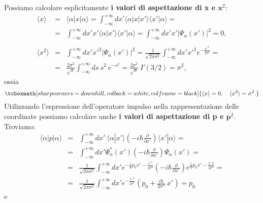 \documentclass[a4paper,12pt,oneside]{book}
\begin{document}
Possiamo calcolare esplicitamente \textbf{i valori di aspettazione di x e $\mathbf x^2$}:
	\begin{eqnarray}
		\langle x \rangle &=& \langle \alpha | x | \alpha \rangle = \int_{-\infty}^{+\infty} dx' \langle \alpha | x | x' \rangle \langle x' | \alpha \rangle =  \nonumber \\
		&=&  \int_{-\infty}^{+\infty} dx' x' \langle \alpha | x' \rangle \langle x' | \alpha \rangle = \int_{-\infty}^{+\infty} dx' x' |\Psi_\alpha (x')|^2 = 0,\\
		\nonumber \\
		\langle x^2 \rangle &=&  \int_{-\infty}^{+\infty} dx' x'^2 |\Psi_\alpha (x')|^2 = \frac{1}{\sqrt{2 \pi \sigma^2}} \int_{-\infty}^{+\infty} dx' x'^2 e^{- \frac{x'^2}{2 \sigma^2}} =\nonumber  \\
		&=& \frac{2 \sigma^2}{\sqrt{\pi}} \int_{-\infty}^{+\infty} ds ~ s^2 ~e^{-s^2} = \frac{2 \sigma^2}{\sqrt{\pi}} ~ \Gamma(3/2) = \sigma^2,
	\end{eqnarray}
ossia
	\begin{equation}
		\tcboxmath[sharp corners=downhill, colback=white, colframe=black]{
			\langle x \rangle = 0, \quad \langle x^2 \rangle = \sigma^2.
			}
	\end{equation}
Utilizzando l'espressione dell'operatore impulso nella rappresentazione delle coordinate possiamo calcolare anche \textbf{i valori di aspettazione di p e $\mathbf p^2$}. Troviamo:
	\begin{eqnarray}
		\langle \alpha | p | \alpha \rangle  &=&  \int_{-\infty}^{+\infty} dx'\ \langle \alpha | x' \rangle \left(-i \hbar \frac{\partial}{\partial x'} \right) \langle x' | \alpha \rangle = \nonumber\\
		&=& \int_{-\infty}^{+\infty} dx' \Psi ^* _\alpha(x') \left(-i \hbar \frac{\partial}{\partial x'} \right) \Psi_\alpha(x') = \nonumber \\
		&=& \frac{1}{\sqrt{2 \pi \sigma^2}} \int_{-\infty}^{+\infty} dx' e^{-\frac{i}{\hbar}p_0 x' - \frac{x^{\prime \,2}}{4 \sigma^2}} \left(-i \hbar \frac{\partial}{\partial x'} \right) e^{\frac{i}{\hbar}p_0 x' - \frac{x{\prime \,2}}{4 \sigma^2}} = \nonumber \\
		&=& \frac{1}{\sqrt{2 \pi \sigma^2}} \int_{-\infty}^{+\infty} dx'  e^{- \frac{x^{\prime \,2}}{2 \sigma^2}} \left(p_0 + \frac{i \hbar}{2 \sigma^2} ~x' \right) = p_0
	\end{eqnarray}
e
\end{document}
